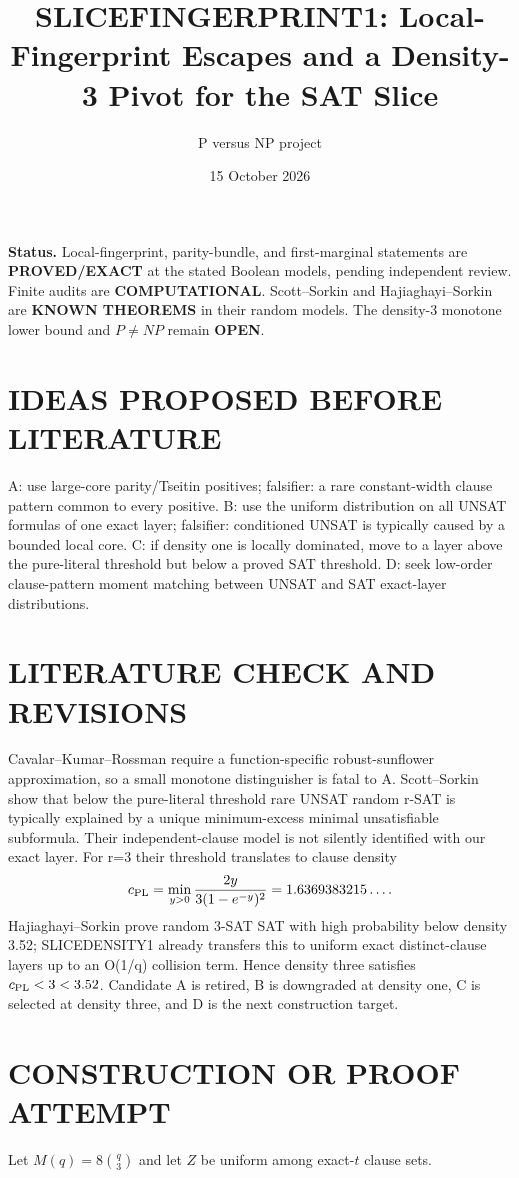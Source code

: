 \documentclass[11pt]{article}
\title{SLICEFINGERPRINT1: Local-Fingerprint Escapes and a Density-3 Pivot for the SAT Slice}
\author{P versus NP project}
\date{15 October 2026}
\begin{document}
\maketitle
\noindent\textbf{Status.} Local-fingerprint, parity-bundle, and first-marginal statements are \textbf{PROVED/EXACT} at the stated Boolean models, pending independent review. Finite audits are \textbf{COMPUTATIONAL}. Scott--Sorkin and Hajiaghayi--Sorkin are \textbf{KNOWN THEOREMS} in their random models. The density-3 monotone lower bound and $P\ne NP$ remain \textbf{OPEN}.

\section{IDEAS PROPOSED BEFORE LITERATURE}
A: use large-core parity/Tseitin positives; falsifier: a rare constant-width clause pattern common to every positive. B: use the uniform distribution on all UNSAT formulas of one exact layer; falsifier: conditioned UNSAT is typically caused by a bounded local core. C: if density one is locally dominated, move to a layer above the pure-literal threshold but below a proved SAT threshold. D: seek low-order clause-pattern moment matching between UNSAT and SAT exact-layer distributions.

\section{LITERATURE CHECK AND REVISIONS}
Cavalar--Kumar--Rossman require a function-specific robust-sunflower approximation, so a small monotone distinguisher is fatal to A. Scott--Sorkin show that below the pure-literal threshold rare UNSAT random r-SAT is typically explained by a unique minimum-excess minimal unsatisfiable subformula. Their independent-clause model is not silently identified with our exact layer. For r=3 their threshold translates to clause density
\[
c_{\rm PL}=\min_{y>0}\frac{2y}{3(1-e^{-y})^2}=1.6369383215\ldots.
\]
Hajiaghayi--Sorkin prove random 3-SAT SAT with high probability below density 3.52; SLICEDENSITY1 already transfers this to uniform exact distinct-clause layers up to an O(1/q) collision term. Hence density three satisfies $c_{\rm PL}<3<3.52$. Candidate A is retired, B is downgraded at density one, C is selected at density three, and D is the next construction target.

\section{CONSTRUCTION OR PROOF ATTEMPT}
Let $M(q)=8\binom q3$ and let $Z$ be uniform among exact-$t$ clause sets.
\end{document}
